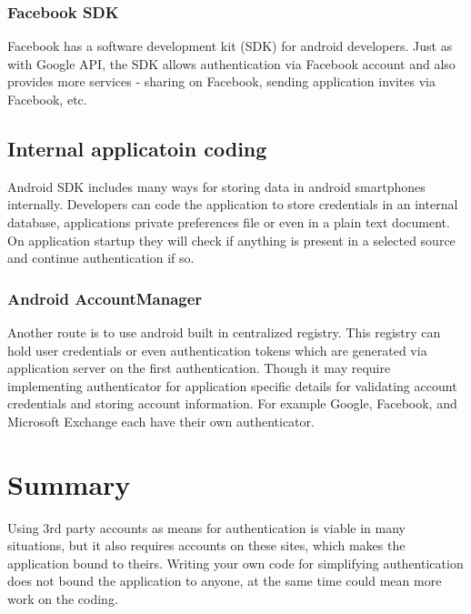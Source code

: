 \subsubsection{Facebook SDK}
Facebook has a software development kit (SDK) for android developers. Just as with Google API, the SDK allows authentication via Facebook account and also provides more services - sharing on Facebook, sending application invites via Facebook, etc.

\subsection{Internal applicatoin coding}
Android SDK includes many ways for storing data in android smartphones internally. Developers can code the application to store credentials in an internal database, applications private preferences file or even in a plain text document. On application startup they will check if anything is present in a selected  source and continue authentication if so.

\subsubsection{Android AccountManager}
Another route is to use android built in centralized registry. This registry can hold user credentials or even authentication tokens which are generated via application server on the first authentication. Though it may require implementing authenticator for application specific details for validating account credentials and storing account information. For example Google, Facebook, and Microsoft Exchange each have their own authenticator.

\section{Summary}
Using 3rd party accounts as means for authentication is viable in many situations, but it also requires accounts on these sites, which makes the application bound to theirs. Writing your own code for simplifying authentication does not bound the application to anyone, at the same time could mean more work on the coding. 




